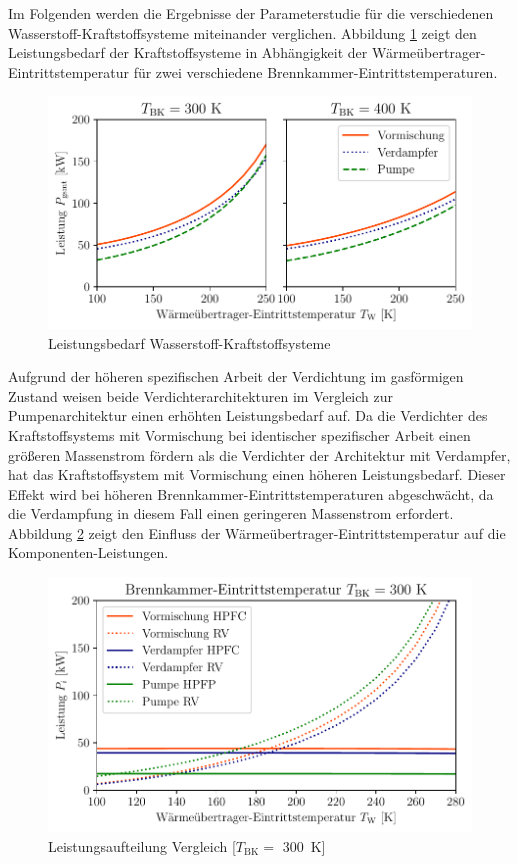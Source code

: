 Im Folgenden werden die Ergebnisse der Parameterstudie für die verschiedenen Wasserstoff-Kraftstoffsysteme miteinander verglichen. Abbildung \ref{fig:comp_power} zeigt den Leistungsbedarf der Kraftstoffsysteme in Abhängigkeit der Wärmeübertrager-Eintrittstemperatur für zwei verschiedene Brennkammer-Eintrittstemperaturen.

\begin{figure}[ht]
\centering
\includegraphics[width=0.9\linewidth]{4_Abbildungen/2_Hauptteil/Ergebnisse/summary_power.pdf}
  \caption{Leistungsbedarf Wasserstoff-Kraftstoffsysteme}
  \label{fig:comp_power}
\end{figure}
\FloatBarrier

Aufgrund der höheren spezifischen Arbeit der Verdichtung im gasförmigen Zustand weisen beide Verdichterarchitekturen im Vergleich zur Pumpenarchitektur einen erhöhten Leistungsbedarf auf. Da die Verdichter des Kraftstoffsystems mit Vormischung bei identischer spezifischer Arbeit einen größeren Massenstrom  fördern als die Verdichter der Architektur mit Verdampfer, hat das Kraftstoffsystem mit Vormischung einen höheren Leistungsbedarf. Dieser Effekt wird bei höheren Brennkammer-Eintrittstemperaturen abgeschwächt, da die Verdampfung in diesem Fall einen geringeren Massenstrom erfordert. Abbildung \ref{fig:comp_split} zeigt den Einfluss der Wärmeübertrager-Eintrittstemperatur auf die Komponenten-Leistungen.

\begin{figure}[ht]
\centering
\includegraphics[width=0.9\linewidth]{4_Abbildungen/2_Hauptteil/Ergebnisse/300summary_powersplit.pdf}
  \caption{Leistungsaufteilung Vergleich [$T_\mathrm{BK}=$ \SI{300}{\K}]}
  \label{fig:comp_split}
\end{figure}
\FloatBarrier

